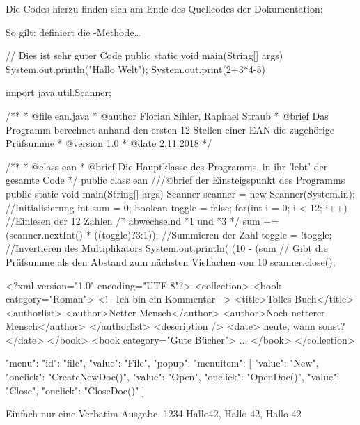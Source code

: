 \documentclass{sopra-base}
\begin{document}
Die Codes hierzu finden sich am Ende des Quellcodes der Dokumentation:

So gilt:  definiert die -Methode\ldots\blindtext[1]
\begin{plainjava}
// Dies ist sehr guter Code
public static void main(String[] args){
    System.out.println("Hallo Welt");
    System.out.print(2+3*4-5)
}
\end{plainjava}

\begin{java}
import java.util.Scanner;

/**
 *  @file ean.java
 *  @author Florian Sihler, Raphael Straub
 *  @brief Das Programm berechnet anhand den ersten 12 Stellen einer EAN die zugehörige Prüfsumme
 *  @version 1.0
 *  @date 2.11.2018
 */

/**
 * @class ean
 * @brief Die Hauptklasse des Programms, in ihr 'lebt' der gesamte Code
 */
public class ean {
    ///@brief der Einsteigspunkt des Programms
    public static void main(String[] args){
        Scanner scanner = new Scanner(System.in); //Initialisierung
        int sum = 0; boolean toggle = false;
        for(int i = 0; i < 12; i++){ //Einlesen der 12 Zahlen
                                         /* abwechselnd *1 und *3 */
            sum += (scanner.nextInt() * ((toggle)?3:1)); //Summieren der Zahl
            toggle = !toggle; //Invertieren des Multiplikators
        }
        System.out.println( (10 - (sum %
        // Gibt die Prüfsumme als den Abstand zum nächsten Vielfachen von 10
        scanner.close();
    }
}
\end{java}

\begin{xml*}[morekeywords={[3]{collection,book,title,authorlist,description,date,author}}]
<?xml version="1.0" encoding="UTF-8"?>
<collection>
    <book category="Roman">
        <!-- Ich bin ein Kommentar -->
        <title>Tolles Buch</title>
        <authorlist>
            <author>Netter Mensch</author>
            <author>Noch netterer Mensch</author>
        </authorlist>
        <description />
        <date> heute, wann sonst? </date>
    </book>
    <book category="Gute Bücher">
        ...
    </book>
</collection>
\end{xml*}

\begin{json}
{"menu": {
  "id": "file",
  "value": "File",
  "popup": {
    "menuitem": [
      {"value": "New", "onclick": "CreateNewDoc()"},
      {"value": "Open", "onclick": "OpenDoc()"},
      {"value": "Close", "onclick": "CloseDoc()"}
    ]
  }
}}
\end{json}

\begin{void}
Einfach nur eine Verbatim-Ausgabe. 1234 Hallo42, Hallo 42, Hallo 42
\end{void}
\end{document}
